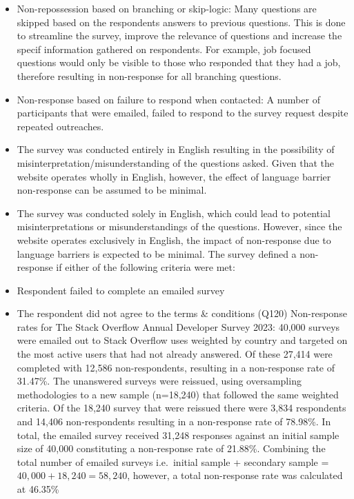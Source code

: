 \documentclass[
  12pt,
]{article}
\providecommand{\tightlist}{%
  \setlength{\itemsep}{0pt}\setlength{\parskip}{0pt}}
\begin{document}
\begin{itemize}
\tightlist
\item
  Non-repossession based on branching or skip-logic: Many questions are
  skipped based on the respondents answers to previous questions. This
  is done to streamline the survey, improve the relevance of questions
  and increase the specif information gathered on respondents. For
  example, job focused questions would only be visible to those who
  responded that they had a job, therefore resulting in non-response for
  all branching questions.
\item
  Non-response based on failure to respond when contacted: A number of
  participants that were emailed, failed to respond to the survey
  request despite repeated outreaches.
\item
  The survey was conducted entirely in English resulting in the
  possibility of misinterpretation/misunderstanding of the questions
  asked. Given that the website operates wholly in English, however, the
  effect of language barrier non-response can be assumed to be minimal.
\item
  The survey was conducted solely in English, which could lead to
  potential misinterpretations or misunderstandings of the questions.
  However, since the website operates exclusively in English, the impact
  of non-response due to language barriers is expected to be minimal.
  \newline \newline \newline The survey defined a non-response if either
  of the following criteria were met:
\item
  Respondent failed to complete an emailed survey
\item
  The respondent did not agree to the terms \& conditions (Q120)
  \newline Non-response rates for The Stack Overflow Annual Developer
  Survey 2023: 40,000 surveys were emailed out to Stack Overflow uses
  weighted by country and targeted on the most active users that had not
  already answered. Of these 27,414 were completed with 12,586
  non-respondents, resulting in a non-response rate of 31.47\%. The
  unanswered surveys were reissued, using oversampling methodologies to
  a new sample (n=18,240) that followed the same weighted criteria. Of
  the 18,240 survey that were reissued there were 3,834 respondents and
  14,406 non-respondents resulting in a non-response rate of 78.98\%. In
  total, the emailed survey received 31,248 responses against an initial
  sample size of 40,000 constituting a non-response rate of 21.88\%.
  Combining the total number of emailed surveys i.e.~initial sample +
  secondary sample = \(40,000 + 18,240= 58,240\), however, a total
  non-response rate was calculated at 46.35\%
\end{itemize}
\end{document}
